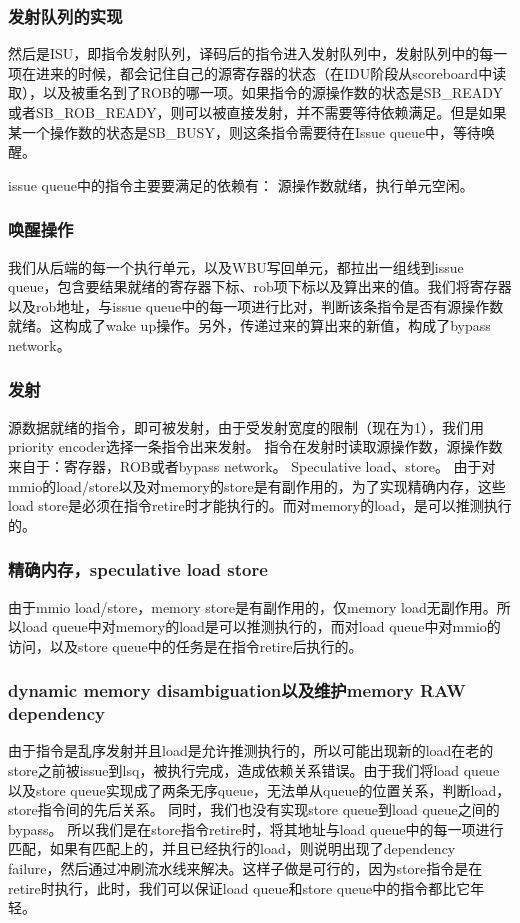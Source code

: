 \documentclass[lang=cn,11pt,a4paper]{elegantpaper}
\begin{document}
\subsubsection{发射队列的实现}

然后是ISU，即指令发射队列，译码后的指令进入发射队列中，发射队列中的每一项在进来的时候，都会记住自己的源寄存器的状态（在IDU阶段从scoreboard中读取），以及被重名到了ROB的哪一项。如果指令的源操作数的状态是SB\_READY或者SB\_ROB\_READY，则可以被直接发射，并不需要等待依赖满足。但是如果某一个操作数的状态是SB\_BUSY，则这条指令需要待在Issue queue中，等待唤醒。

issue queue中的指令主要要满足的依赖有：
源操作数就绪，执行单元空闲。

\subsubsection{唤醒操作}
我们从后端的每一个执行单元，以及WBU写回单元，都拉出一组线到issue queue，包含要结果就绪的寄存器下标、rob项下标以及算出来的值。我们将寄存器以及rob地址，与issue queue中的每一项进行比对，判断该条指令是否有源操作数就绪。这构成了wake up操作。另外，传递过来的算出来的新值，构成了bypass network。

\subsubsection{发射}
源数据就绪的指令，即可被发射，由于受发射宽度的限制（现在为1），我们用priority encoder选择一条指令出来发射。
指令在发射时读取源操作数，源操作数来自于：寄存器，ROB或者bypass network。
Speculative load、store。
由于对mmio的load/store以及对memory的store是有副作用的，为了实现精确内存，这些load store是必须在指令retire时才能执行的。而对memory的load，是可以推测执行的。


\subsubsection{精确内存，speculative load store}
由于mmio load/store，memory store是有副作用的，仅memory load无副作用。所以load queue中对memory的load是可以推测执行的，而对load queue中对mmio的访问，以及store queue中的任务是在指令retire后执行的。


\subsubsection{dynamic memory disambiguation以及维护memory RAW dependency}
由于指令是乱序发射并且load是允许推测执行的，所以可能出现新的load在老的store之前被issue到lsq，被执行完成，造成依赖关系错误。由于我们将load queue以及store queue实现成了两条无序queue，无法单从queue的位置关系，判断load，store指令间的先后关系。
同时，我们也没有实现store queue到load queue之间的bypass。
所以我们是在store指令retire时，将其地址与load queue中的每一项进行匹配，如果有匹配上的，并且已经执行的load，则说明出现了dependency failure，然后通过冲刷流水线来解决。这样子做是可行的，因为store指令是在retire时执行，此时，我们可以保证load queue和store queue中的指令都比它年轻。
\end{document}
